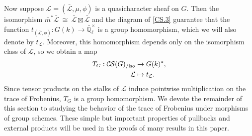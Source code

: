 \documentclass[10pt]{amsart}
\theoremstyle{plain}
\theoremstyle{definition}
\theoremstyle{remark}
\newcommand{\EE}{\mathbb{\bar Q}_\ell}
\newcommand{\Fq}{k}
\newcommand{\EEx}{\EE^\times}
\newcommand{\iso}{{\ \cong\ }}
\newcommand{\trFrob}[1]{t_{#1}}
\newcommand{\TrFrob}[1]{T_{#1}}
\newcommand{\cs}[1]{{\mathcal{#1}}}
\newcommand{\gcs}[1]{{\mathcal{\bar #1}}}
\newcommand{\CS}{{\mathcal{C\hskip-0.8pt S}}}
\newcommand{\CSiso}[1]{\CS(#1)_{/\text{iso}}}
\newcommand{\bm}{\bar{m}}
\begin{document}
Now suppose $\cs{L} = (\gcs{L},\mu,\phi)$ is a quasicharacter sheaf on $G$.
Then the isomorphism $\bm^* \gcs{L} \iso \gcs{L} \boxtimes\gcs{L}$ and the diagram of
\ref{CS.3} guarantee
that the function $\trFrob{(\gcs{L},\phi)} : G(\Fq)\to \EEx$ is a group homomorphism, which we will also denote by $\trFrob{\cs{L}}$.  Moreover,
this homomorphism depends only on the isomorphism class of $\cs{L}$, so we obtain a map
\begin{align*}
\TrFrob{G} : \CSiso{G} &\to G(\Fq)^*, \\
\cs{L} &\mapsto \trFrob{\cs{L}}.
\end{align*}
Since tensor products on the stalks of $\cs{L}$ induce pointwise multiplication on the trace of Frobenius, $\TrFrob{G}$ is a group homomorphism.  We devote the remainder of this section to
studying the behavior of the trace of Frobenius under morphisms of group schemes.  These simple but important
properties of pullbacks and external products will be used in the proofs of many results in this paper.
\end{document}
